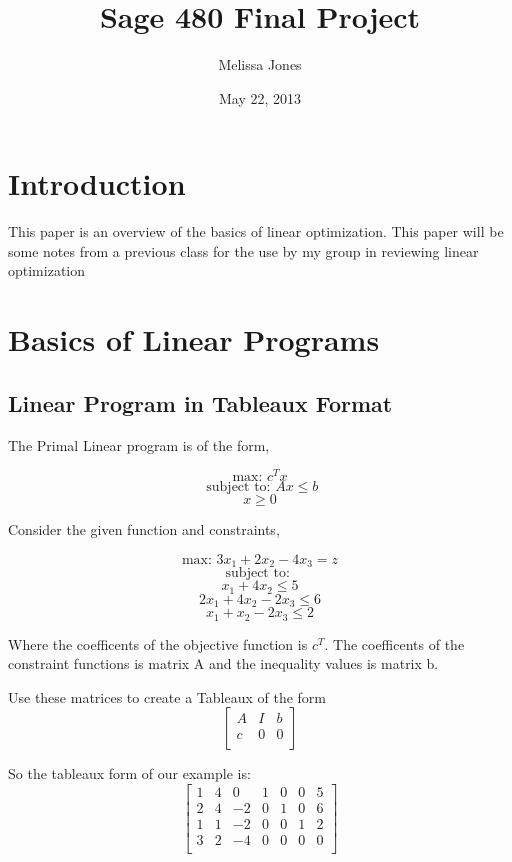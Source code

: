\documentclass{article}
\title{Sage 480 Final Project}
\author{Melissa Jones}
\date{May 22, 2013}
\begin{document}
\maketitle
\section{Introduction}

This paper is an overview of the basics of linear optimization. This paper will be some notes
from a previous class for the use by my group in reviewing linear optimization

\section{Basics of Linear Programs}

\subsection{Linear Program in Tableaux Format}

The Primal Linear program is of the form,

   $$\textrm{max:\ } c^Tx$$
   $$\textrm{ subject\ to:\ } Ax\leq b$$
                $$x\geq 0$$

Consider the given function and constraints,

$$\textrm{max:\ } 3x_1+2x_2-4x_3 = z$$
$$\textrm{subject\ to:\ }$$
            $$x_1+4x_2\leq 5$$
            $$ 2x_1+4x_2-2x_3\leq 6$$
            $$ x_1+x_2-2x_3\leq 2$$

Where the coefficents of the objective function is $c^T$. The coefficents
of the constraint functions is matrix A
and the inequality values is matrix b.

Use these matrices to create a Tableaux of the form
$$ \left[\begin{array}{ccc}
    A & I & b \\
    c & 0 & 0 \\
    \end{array} \right]
    $$

So the tableaux form of our example is:
$$ \left[ \begin{array}{ccccccc}
    1&4&0&1&0&0&5\\
    2&4&-2&0&1&0&6\\
    1&1&-2&0&0&1&2\\
    3&2&-4&0&0&0&0\\
    \end{array} \right]
$$
\end{document}
